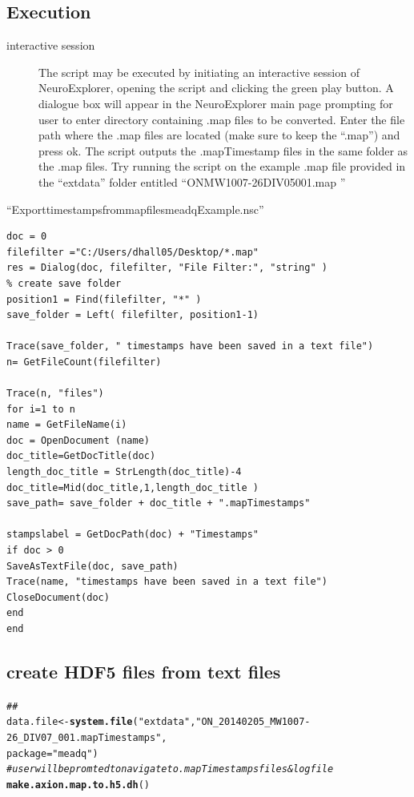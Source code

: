 \documentclass{article}\usepackage[]{graphicx}\usepackage[]{color}
\makeatletter
\newcommand{\hlstr}[1]{\textcolor[rgb]{0.192,0.494,0.8}{#1}}%
\newcommand{\hlcom}[1]{\textcolor[rgb]{0.678,0.584,0.686}{\textit{#1}}}%
\newcommand{\hlstd}[1]{\textcolor[rgb]{0.345,0.345,0.345}{#1}}%
\newcommand{\hlkwb}[1]{\textcolor[rgb]{0.69,0.353,0.396}{#1}}%
\newcommand{\hlkwc}[1]{\textcolor[rgb]{0.333,0.667,0.333}{#1}}%
\newcommand{\hlkwd}[1]{\textcolor[rgb]{0.737,0.353,0.396}{\textbf{#1}}}%
\newenvironment{kframe}{%
 \def\at@end@of@kframe{}%
 \ifinner\ifhmode%
  \def\at@end@of@kframe{\end{minipage}}%
  \begin{minipage}{\columnwidth}%
 \fi\fi%
 \def\FrameCommand##1{\hskip\@totalleftmargin \hskip-\fboxsep
 \colorbox{shadecolor}{##1}\hskip-\fboxsep
     \hskip-\linewidth \hskip-\@totalleftmargin \hskip\columnwidth}%
 \MakeFramed {\advance\hsize-\width
   \@totalleftmargin\z@ \linewidth\hsize
   \@setminipage}}%
 {\par\unskip\endMakeFramed%
 \at@end@of@kframe}
\newenvironment{knitrout}{}{} %
\makeatother
\begin{document}
\subsection*{Execution}
\begin{description}
\item[interactive session] The script may be executed by initiating an interactive session of NeuroExplorer, opening the script and clicking the green play button.  A dialogue box will appear in the NeuroExplorer main page prompting for user to enter directory containing .map files to be converted.  Enter the file path where the .map files are located (make sure to keep the ``.\text{*}map'') and press ok.  The script outputs the .mapTimestamp files in the same folder as the .map files.  Try running the script on the example .map file provided in the ``extdata'' folder entitled ``ON\textunderscore MW1007-26\textunderscore DIV05\textunderscore 001.map ''

\end{description}


``Export\textunderscore timestamps\textunderscore from\textunderscore map\textunderscore files\textunderscore meadqExample.nsc''

\begin{verbatim}
doc = 0
filefilter ="C:/Users/dhall05/Desktop/*.map"
res = Dialog(doc, filefilter, "File Filter:", "string" )
% create save folder
position1 = Find(filefilter, "*" )
save_folder = Left( filefilter, position1-1)

Trace(save_folder, " timestamps have been saved in a text file")
n= GetFileCount(filefilter)

Trace(n, "files")
for i=1 to n
name = GetFileName(i)
doc = OpenDocument (name)
doc_title=GetDocTitle(doc)
length_doc_title = StrLength(doc_title)-4
doc_title=Mid(doc_title,1,length_doc_title )
save_path= save_folder + doc_title + ".mapTimestamps"

stampslabel = GetDocPath(doc) + "Timestamps"
if doc > 0
SaveAsTextFile(doc, save_path)
Trace(name, "timestamps have been saved in a text file")
CloseDocument(doc)
end
end
\end{verbatim}

\subsection{create HDF5 files from text files}


\begin{knitrout}
\color{fgcolor}\begin{kframe}
\begin{alltt}
\hlcom{## }
\hlstd{data.file} \hlkwb{<-} \hlkwd{system.file}\hlstd{(}\hlstr{"extdata"}\hlstd{,} \hlstr{"ON_20140205_MW1007-26_DIV07_001.mapTimestamps"}\hlstd{,}
    \hlkwc{package} \hlstd{=} \hlstr{"meadq"}\hlstd{)}
\hlcom{# user will be promted to navigate to .mapTimestamps files & log file}
\hlkwd{make.axion.map.to.h5.dh}\hlstd{()}
\end{alltt}
\end{kframe}
\end{knitrout}
\end{document}
